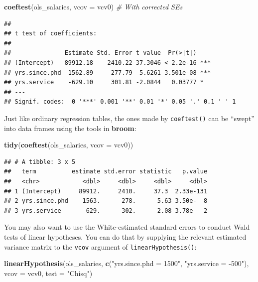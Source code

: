 \documentclass[
  12pt,
  oneside,openany]{book}
\newenvironment{Shaded}{\begin{snugshade}}{\end{snugshade}}
\newcommand{\CommentTok}[1]{\textcolor[rgb]{0.56,0.35,0.01}{\textit{#1}}}
\newcommand{\DataTypeTok}[1]{\textcolor[rgb]{0.13,0.29,0.53}{#1}}
\newcommand{\KeywordTok}[1]{\textcolor[rgb]{0.13,0.29,0.53}{\textbf{#1}}}
\newcommand{\NormalTok}[1]{#1}
\newcommand{\StringTok}[1]{\textcolor[rgb]{0.31,0.60,0.02}{#1}}
\begin{document}
\begin{Shaded}
\begin{Highlighting}[]
\KeywordTok{coeftest}\NormalTok{(ols\_salaries, }\DataTypeTok{vcov =}\NormalTok{ vcv0)  }\CommentTok{\# With corrected SEs}
\end{Highlighting}
\end{Shaded}

\begin{verbatim}
## 
## t test of coefficients:
## 
##               Estimate Std. Error t value  Pr(>|t|)    
## (Intercept)   89912.18    2410.22 37.3046 < 2.2e-16 ***
## yrs.since.phd  1562.89     277.79  5.6261 3.501e-08 ***
## yrs.service    -629.10     301.81 -2.0844   0.03777 *  
## ---
## Signif. codes:  0 '***' 0.001 '**' 0.01 '*' 0.05 '.' 0.1 ' ' 1
\end{verbatim}

Just like ordinary regression tables, the ones made by \texttt{coeftest()} can be ``swept'' into data frames using the tools in \textbf{broom}:

\begin{Shaded}
\begin{Highlighting}[]
\KeywordTok{tidy}\NormalTok{(}\KeywordTok{coeftest}\NormalTok{(ols\_salaries, }\DataTypeTok{vcov =}\NormalTok{ vcv0))}
\end{Highlighting}
\end{Shaded}

\begin{verbatim}
## # A tibble: 3 x 5
##   term          estimate std.error statistic   p.value
##   <chr>            <dbl>     <dbl>     <dbl>     <dbl>
## 1 (Intercept)     89912.     2410.     37.3  2.33e-131
## 2 yrs.since.phd    1563.      278.      5.63 3.50e-  8
## 3 yrs.service      -629.      302.     -2.08 3.78e-  2
\end{verbatim}

You may also want to use the White-estimated standard errors to conduct Wald tests of linear hypotheses. You can do that by supplying the relevant estimated variance matrix to the \texttt{vcov} argument of \texttt{linearHypothesis()}:

\begin{Shaded}
\begin{Highlighting}[]
\KeywordTok{linearHypothesis}\NormalTok{(ols\_salaries,}
                 \KeywordTok{c}\NormalTok{(}\StringTok{"yrs.since.phd = 1500"}\NormalTok{, }\StringTok{"yrs.service = {-}500"}\NormalTok{),}
                 \DataTypeTok{vcov =}\NormalTok{ vcv0,}
                 \DataTypeTok{test =} \StringTok{"Chisq"}\NormalTok{)}
\end{Highlighting}
\end{Shaded}
\end{document}
